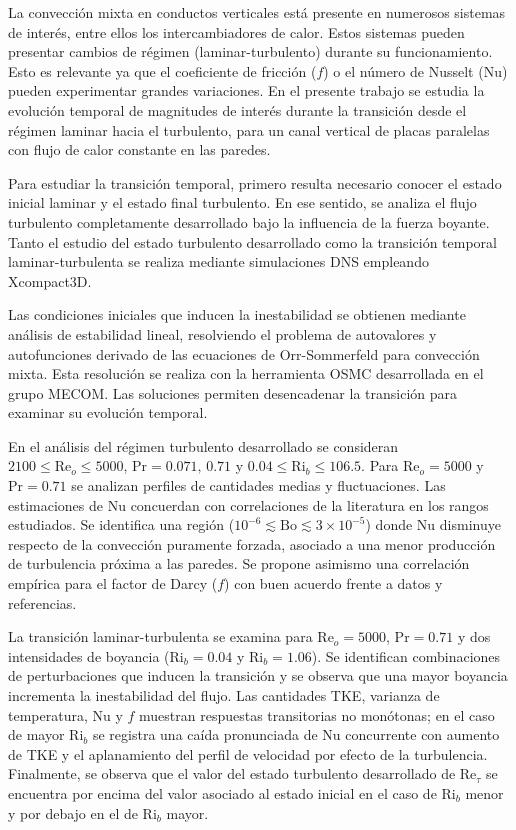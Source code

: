 \begin{resumen}%

La convección mixta en conductos verticales está presente en numerosos sistemas de interés, entre ellos los intercambiadores de calor. Estos sistemas pueden presentar cambios de régimen (laminar-turbulento) durante su funcionamiento. Esto es relevante ya que el coeficiente de fricción ($f$) o el número de Nusselt (Nu) pueden experimentar grandes variaciones. En el presente trabajo se estudia la evolución temporal de magnitudes de interés durante la transición desde el régimen laminar hacia el turbulento, para un canal vertical de placas paralelas con flujo de calor constante en las paredes.

Para estudiar la transición temporal, primero resulta necesario conocer el estado inicial laminar y el estado final turbulento. En ese sentido, se analiza el flujo turbulento completamente desarrollado bajo la influencia de la fuerza boyante. Tanto el estudio del estado turbulento desarrollado como la transición temporal laminar-turbulenta se realiza mediante simulaciones DNS empleando Xcompact3D. 

Las condiciones iniciales que inducen la inestabilidad se obtienen mediante análisis de estabilidad lineal, resolviendo el problema de autovalores y autofunciones derivado de las ecuaciones de Orr-Sommerfeld para convección mixta. Esta resolución se realiza con la herramienta OSMC desarrollada en el grupo MECOM. Las soluciones permiten desencadenar la transición para examinar su evolución temporal. 

En el análisis del régimen turbulento desarrollado se consideran $2100 \leq \mathrm{Re}_o \leq 5000$, $\mathrm{Pr}=0\text{.}071,\,0\text{.}71$ y $0\text{.}04 \leq \mathrm{Ri}_b \leq 106\text{.}5$. Para $\mathrm{Re}_o=5000$ y $\mathrm{Pr}=0\text{.}71$ se \linebreak analizan perfiles de cantidades medias y fluctuaciones. Las estimaciones de Nu concuerdan con correlaciones de la literatura en los rangos estudiados. Se identifica una región ($10^{-6} \lesssim \text{Bo} \lesssim 3 \times 10^{-5}$) donde Nu disminuye respecto de la convección puramente forzada, asociado a una menor producción de turbulencia próxima a las  paredes. Se propone asimismo una correlación empírica para el factor de Darcy ($f$) con buen acuerdo frente a datos y referencias.

La transición laminar-turbulenta se examina para $\mathrm{Re}_o=5000$, $\mathrm{Pr}=0\text{.}71$ y dos intensidades de boyancia ($\mathrm{Ri}_b=0\text{.}04$ y $\mathrm{Ri}_b=1\text{.}06$). Se identifican combinaciones de perturbaciones que inducen la transición y se observa que una mayor boyancia incrementa la inestabilidad del flujo. Las cantidades TKE, varianza de temperatura, Nu y $f$ muestran respuestas transitorias no monótonas; en el caso de mayor $\mathrm{Ri}_b$ se registra una caída pronunciada de Nu concurrente con aumento de TKE y el aplanamiento del perfil de velocidad por efecto de la turbulencia. Finalmente, se observa que el valor del estado turbulento desarrollado de $\mathrm{Re}_\tau$ se encuentra por encima del valor asociado al estado inicial en el caso de $\mathrm{Ri}_b$ menor y por debajo en el de $\mathrm{Ri}_b$ mayor.


\end{resumen}
